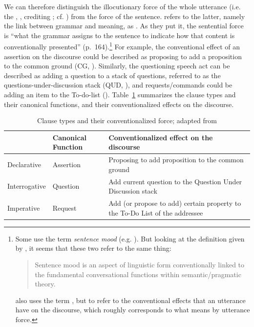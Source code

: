 We can therefore distinguish the illocutionary force of the whole utterance (i.e. the , \cite{murray2018force}, crediting \cite{chierchia2000textbook}; cf. \cite{portner2018}) from the force of the sentence. 
\textcite{chierchia1990textbook} refers to the latter, namely the link between grammar and meaning, as . As they put it, the sentential force is ``what the grammar assigns to the sentence to indicate how that content is conventionally presented'' (p.\ 164).\footnote{Some use the term \emph{sentence mood} (e.g. \cite{portner2018}). But looking at the definition given by \textcite{portner2018}, it seems that these two refer to the same thing:
\begin{quote}
Sentence mood is an aspect of linguistic form conventionally linked to the fundamental conversational functions within semantic/pragmatic theory.\\
\hspace*{\fill} \hfill \cite[122]{portner2018}
\end{quote}
\cite{portner2018} also uses the term , but to refer to the conventional effects that an utterance have on the discourse, which roughly corresponds to what \textcite{chierchia2000textbook} means by utterance force.  
} For example, the conventional effect of an assertion on the discourse could be described as proposing to add a proposition to the common ground (CG, \cite{stalnaker1978assertion,stalnaker2002cg}). Similarly, the questioning speech act can be described as adding a question to a stack of questions, referred to as the questions-under-discussion stack (QUD, \cite{roberts1996, ginzburg1995-1}), and requests/commands could be adding an item to the To-do-list (\cite{portner2004}). Table~\ref{tab:intro:portner2004} summarizes the clause types and their canonical functions, and their conventionalized effects on the discourse.

\begin{table}[H]
\begin{center}
\begin{tabular}{l|l|p{8cm}} 
\hline 
& Canonical Function & Conventionalized effect on the discourse \\
\hline
Declarative & Assertion & Proposing to add proposition to the common ground \\ 
\hline
Interrogative & Question & Add current question to the Question Under Discussion stack \\
\hline
Imperative & Request & Add (or propose to add) certain property to the To-Do List of the addressee \\ 
\hline
\end{tabular} 
\end{center}
\caption{Clause types and their conventionalized force; adapted from \textcite[238]{portner2004}}
\label{tab:intro:portner2004}
\end{table}



